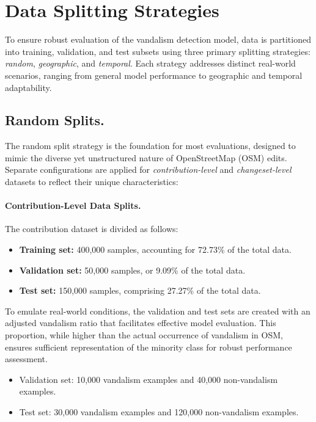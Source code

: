 \documentclass[
    13pt, %
    a4paper, %
    listof=totoc, %
    bibliography=totoc, %
    index=totoc, %
    headsepline
]{scrreprt}
\begin{document}
\section{Data Splitting Strategies}
\label{sec:data_splitting}

To ensure robust evaluation of the vandalism detection model, data is partitioned into training, validation, and test subsets using three primary splitting strategies: \textit{random}, \textit{geographic}, and \textit{temporal}. Each strategy addresses distinct real-world scenarios, ranging from general model performance to geographic and temporal adaptability.

\subsection{Random Splits.}
The random split strategy is the foundation for most evaluations, designed to mimic the diverse yet unstructured nature of OpenStreetMap (OSM) edits. Separate configurations are applied for \textit{contribution-level} and \textit{changeset-level} datasets to reflect their unique characteristics:

\paragraph{Contribution-Level Data Splits.}
The contribution dataset is divided as follows:
\begin{itemize}
    \item \textbf{Training set:} 400,000 samples, accounting for 72.73\% of the total data.
    \item \textbf{Validation set:} 50,000 samples, or 9.09\% of the total data.
    \item \textbf{Test set:} 150,000 samples, comprising 27.27\% of the total data.
\end{itemize}

\noindent To emulate real-world conditions, the validation and test sets are created with an adjusted vandalism ratio that facilitates effective model evaluation. This proportion, while higher than the actual occurrence of vandalism in OSM, ensures sufficient representation of the minority class for robust performance assessment.
\begin{itemize}
    \item Validation set: 10,000 vandalism examples and 40,000 non-vandalism examples.
    \item Test set: 30,000 vandalism examples and 120,000 non-vandalism examples.
\end{itemize}
\end{document}
